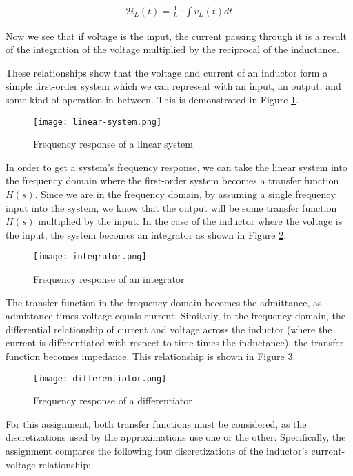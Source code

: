 \documentclass[10pt, oneside, letterpaper]{article}
\begin{document}
\begin{alignat}{2}
  i_L(t) = \frac{1}{L}\cdot{}\int{v_L(t)dt}
\end{alignat}

Now we see that if voltage is the input, the current passing through it is a result of the integration of the voltage multiplied by the reciprocal of the inductance.

These relationships show that the voltage and current of an inductor form a simple first-order system which we can represent with an input, an output, and some kind of operation in between. This is demonstrated in Figure \ref{linear-system}.

\begin{figure}[H]
  \centering
  \texttt{[image: linear-system.png]}
  \caption{Frequency response of a linear system}
  \label{linear-system}
\end{figure}

In order to get a system's frequency response, we can take the linear system into the frequency domain where the first-order system becomes a transfer function $H(s)$. Since we are in the frequency domain, by assuming a single frequency input into the system, we know that the output will be some transfer function $H(s)$ multiplied by the input. In the case of the inductor where the voltage is the input, the system becomes an integrator as shown in Figure \ref{integrator}.

\begin{figure}[H]
  \centering
  \texttt{[image: integrator.png]}
  \caption{Frequency response of an integrator}
  \label{integrator}
\end{figure}

The transfer function in the frequency domain becomes the admittance, as admittance times voltage equals current. Similarly, in the frequency domain, the differential relationship of current and voltage across the inductor (where the current is differentiated with respect to time times the inductance), the transfer function becomes impedance. This relationship is shown in Figure \ref{differentiator}.

\begin{figure}[H]
  \centering
  \texttt{[image: differentiator.png]}
  \caption{Frequency response of a differentiator}
  \label{differentiator}
\end{figure}

For this assignment, both transfer functions must be considered, as the discretizations used by the approximations use one or the other. Specifically, the assignment compares the following four discretizations of the inductor's current-voltage relationship:
\end{document}
